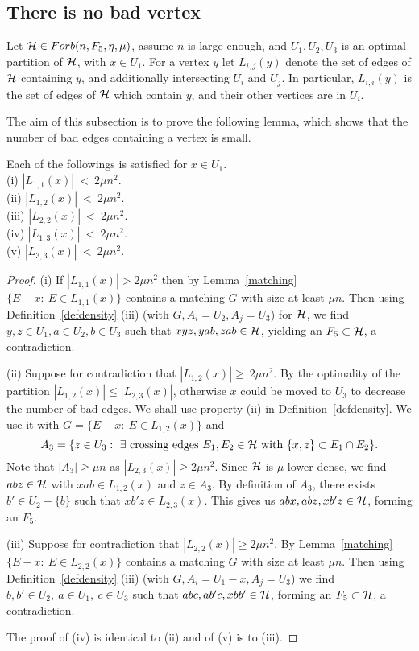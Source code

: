 \documentclass[11pt]{article}
\begin{document}
\subsection{There is no  bad vertex}

Let $\mathcal{H} \in Forb(n,F_5,\eta,\mu)$, assume $n$ is large enough, and
$U_1,U_2,U_3$ is an optimal
 partition of $\mathcal{H}$, with $x\in U_1$.
For a vertex $y$ let $L_{i,j}(y)$ denote the set of edges of $\mathcal{H}$
containing $y$, and additionally intersecting $U_i$ and $U_j$. In
particular, $L_{i,i}(y)$ is the set of edges of $\mathcal{H}$ which contain
$y$, and their other vertices are in $U_i$.

The aim of this subsection is to prove the following lemma, which shows that the number of bad edges
containing a vertex is small.


\begin{lemma}\label{lowdegree}
  Each of the followings is satisfied for $x\in U_1$.\\
(i) $|L_{1,1}(x)|\ <\  2\mu n^2.$\\
(ii) $|L_{1,2}(x)|\ < \ 2\mu n^2.$\\
(iii) $|L_{2,2}(x)|\ < \ 2\mu n^2.$\\
(iv) $|L_{1,3}(x)|\ < \ 2\mu n^2.$\\
(v) $|L_{3,3}(x)|\ < \ 2\mu n^2.$
\end{lemma}

\begin{proof}
(i) If $|L_{1,1}(x)|>2\mu n^2$  then by Lemma~\ref{matching} $
\{E-x:\ E\in L_{1,1}(x)\}$  contains a matching $G$ with size at
least $\mu n$. Then using Definition~\ref{defdensity} (iii) (with
$G, A_i=U_2, A_j=U_3$) for $\mathcal{H}$, we find $y,z\in U_1, a\in U_2,
b\in U_3$ such that $xyz,yab,zab\in \mathcal{H}$,
 yielding an $F_5\subset \mathcal{H}$, a contradiction.

(ii) Suppose for contradiction that $|L_{1,2}(x)|\ge  \ 2\mu n^2$. By the optimality of the partition
 $|L_{1,2}(x)|\le
|L_{2,3}(x)|$, otherwise $x$ could be moved to $U_3$ to decrease the
number of bad edges.
 We shall  use  property (ii) in  Definition~\ref{defdensity}. We use it
with $G=\{E-x:\ E\in L_{1,2}(x)\}$ and
$$A_3=\{z\in U_3: \ \exists \hbox{ crossing edges } E_1,E_2\in \mathcal{H}
\text{ with } \{x,z\}\subset E_1\cap E_2\}.$$
  Note that $|A_3|\ge
\mu n$ as $|L_{2,3}(x)|\ge 2\mu n^2$. Since $\mathcal{H}$ is $\mu$-lower
dense, we find $abz \in \mathcal{H}$ with $xab \in L_{1,2}(x)$ and $z \in
A_3$. By definition of $A_3$, there exists $b' \in U_2-\{b\}$
 such that $xb'z \in L_{2,3}(x)$. This gives us $abx, abz, xb'z\in \mathcal{H}$,
forming an $F_5$.

(iii) Suppose for contradiction that $|L_{2,2}(x)|\ge   2\mu n^2$.
By Lemma~\ref{matching} $\{E-x:\ E\in L_{2,2}(x)\}$ contains a
matching $G$ with size at least $\mu n$. Then using
 Definition~\ref{defdensity} (iii)
(with $G, A_i=U_1-x, A_j=U_3$)
   we find $b,b'\in U_2,\  a\in U_1,\  c\in U_3$ such that $abc, ab'c, xbb'\in \mathcal{H}$,
 forming an $F_5\subset \mathcal{H}$, a contradiction.

The proof of (iv) is identical to (ii) and of (v) is to (iii).
\end{proof}
\end{document}
